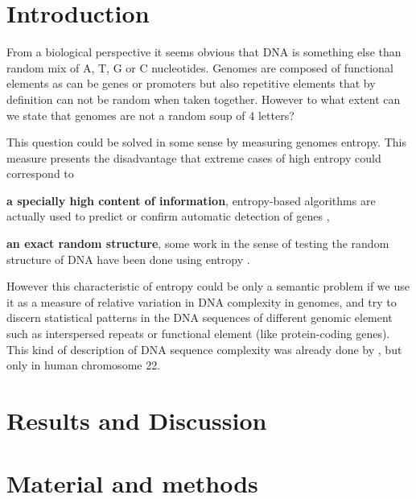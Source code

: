 
\pagestyle{empty}

\section{Introduction}

From a biological perspective it seems obvious that DNA is something else than random mix of A, T, G or C nucleotides. Genomes are composed of functional elements as can be genes or promoters but also repetitive elements that by definition can not be random when taken together. However to what extent can we state that genomes are not a random soup of 4 letters? 

This question could be solved in some sense by measuring genomes entropy. This measure presents the disadvantage that extreme cases of high entropy could correspond to \begin{inparaenum} \item {\bf a specially high content of information}, entropy-based algorithms are actually used to predict or confirm automatic detection of genes \cite{Du2006,Gerstein2007}, \item {\bf an exact random structure}, some work in the sense of testing the random structure of DNA have been done using entropy \cite{Loewenstern1999}. \end{inparaenum} However this characteristic of entropy could be only a semantic problem if we use it as a measure of relative variation in DNA complexity in genomes, and try to discern statistical patterns in the DNA sequences of different genomic element such as interspersed repeats or functional element (like protein-coding genes). This kind of description of DNA sequence complexity was already done by \cite{Holste2001}, but only in human chromosome 22.



\section{Results and Discussion}
\section{Material and methods}



